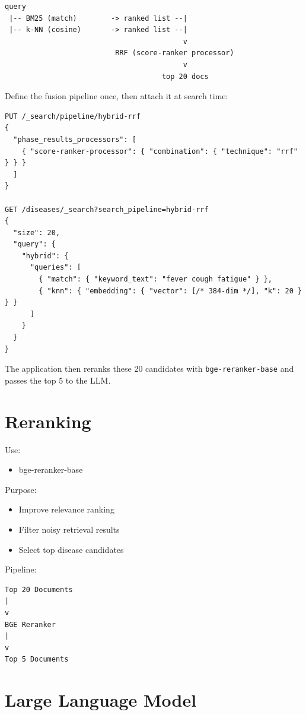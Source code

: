 \documentclass[11pt,a4paper]{article}
\begin{document}
\begin{verbatim}
query
 |-- BM25 (match)        -> ranked list --|
 |-- k-NN (cosine)       -> ranked list --|
                                          v
                          RRF (score-ranker processor)
                                          v
                                     top 20 docs
\end{verbatim}

Define the fusion pipeline once, then attach it at search time:

\begin{lstlisting}[basicstyle=\ttfamily\small]
PUT /_search/pipeline/hybrid-rrf
{
  "phase_results_processors": [
    { "score-ranker-processor": { "combination": { "technique": "rrf" } } }
  ]
}

GET /diseases/_search?search_pipeline=hybrid-rrf
{
  "size": 20,
  "query": {
    "hybrid": {
      "queries": [
        { "match": { "keyword_text": "fever cough fatigue" } },
        { "knn": { "embedding": { "vector": [/* 384-dim */], "k": 20 } } }
      ]
    }
  }
}
\end{lstlisting}

The application then reranks these 20 candidates with \texttt{bge-reranker-base}
and passes the top 5 to the LLM.

\section{Reranking}

Use:

\begin{itemize}
    \item bge-reranker-base
\end{itemize}

Purpose:

\begin{itemize}
    \item Improve relevance ranking
    \item Filter noisy retrieval results
    \item Select top disease candidates
\end{itemize}

Pipeline:

\begin{verbatim}
Top 20 Documents
|
v
BGE Reranker
|
v
Top 5 Documents
\end{verbatim}

\section{Large Language Model}
\end{document}
